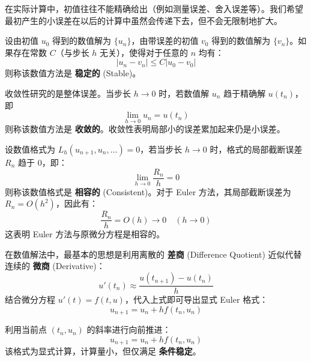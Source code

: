 \begin{definition}
在实际计算中，初值往往不能精确给出（例如测量误差、舍入误差等）。我们希望最初产生的小误差在以后的计算中虽然会传递下去，但不会无限制地扩大。

设由初值 $u_0$ 得到的数值解为 $\{u_n\}$，由带误差的初值 $v_0$ 得到的数值解为 $\{v_n\}$。如果存在常数 $C$（与步长 $h$ 无关），使得对于任意的 $n$ 均有：
\begin{equation}
    |u_n - v_n| \le C |u_0 - v_0|
\end{equation}
则称该数值方法是 \textbf{稳定的} (Stable)。
\end{definition}
\begin{definition}[收敛性]
收敛性研究的是整体误差。当步长 $h \to 0$ 时，若数值解 $u_n$ 趋于精确解 $u(t_n)$，即
\begin{equation}
\lim_{h \to 0} u_n = u(t_n)
\end{equation}
则称该数值方法是 \textbf{收敛的}。收敛性表明局部小的误差累加起来仍是小误差。
\end{definition}
\begin{definition}[相容性]
设数值格式为 $L_h(u_{n+1}, u_n, \dots) = 0$，若当步长 $h \to 0$ 时，格式的局部截断误差 $R_n$ 趋于 $0$，即：
\begin{equation}
    \lim_{h \to 0} \frac{R_n}{h} = 0
\end{equation}
则称该数值格式是 \textbf{相容的} (Consistent)。对于 Euler 方法，其局部截断误差为 $R_n = O(h^2)$，因此有：
\begin{equation}
    \frac{R_n}{h} = O(h) \to 0 \quad (h \to 0)
\end{equation}
这表明 Euler 方法与原微分方程是相容的。
\end{definition}
\begin{definition}[差商代替微商]
在数值解法中，最基本的思想是利用离散的 \textbf{差商} (Difference Quotient) 近似代替连续的 \textbf{微商} (Derivative)：
\begin{equation}
    u'(t_n) \approx \frac{u(t_{n+1}) - u(t_n)}{h}
\end{equation}
结合微分方程 $u'(t) = f(t, u)$，代入上式即可导出显式 Euler 格式：
\begin{equation}
    u_{n+1} = u_n + h f(t_n, u_n)
\end{equation}
\end{definition}
\begin{definition}[显式 Euler 格式]利用当前点 $(t_n, u_n)$ 的斜率进行向前推进：\begin{equation}u_{n+1} = u_n + h f(t_n, u_n)\end{equation}该格式为显式计算，计算量小，但仅满足 \textbf{条件稳定}。\end{definition}
